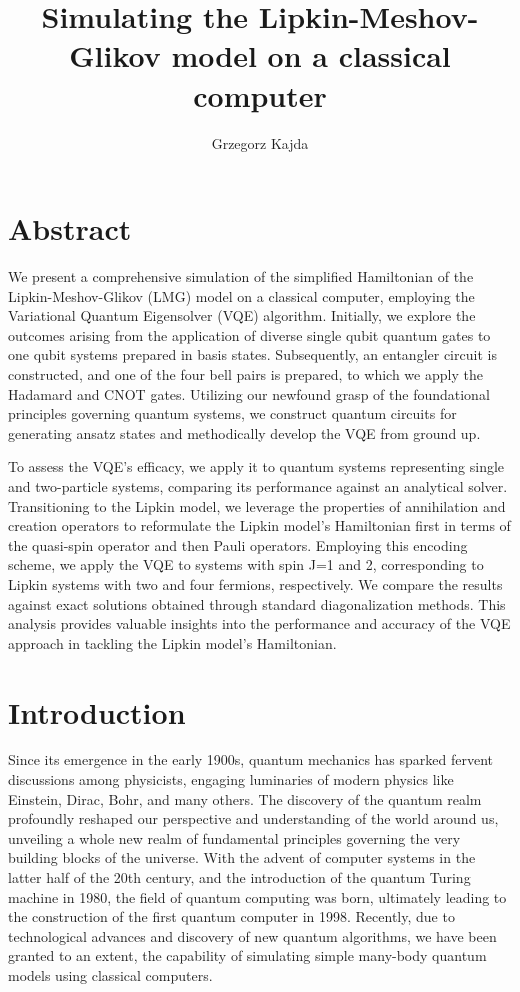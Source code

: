 \documentclass[onecolumn,10pt,cleanfoot]{asme2ej}
\author{Grzegorz Kajda
    \affiliation{
	Bachelor Student, Robotics and Intelligent Systems\\ \\[-10pt]
	Department of Informatics The faculty of Mathematics and Natural Sciences\\ \\[-10pt]
    Email: grzegork@ifi.uio.no
    }
}
\begin{document}
\title{Simulating the Lipkin-Meshov-Glikov model on a classical computer}

\maketitle

\section{Abstract}

We present a comprehensive simulation of the simplified Hamiltonian of the Lipkin-Meshov-Glikov (LMG) model on a classical computer, employing the Variational Quantum Eigensolver (VQE) algorithm. Initially, we explore the outcomes arising from the application of diverse single qubit quantum gates to one qubit systems prepared in basis states. Subsequently, an entangler circuit is constructed, and one of the four bell pairs is prepared, to which we apply the Hadamard and CNOT gates. Utilizing our newfound grasp of the foundational principles governing quantum systems, we construct quantum circuits for generating ansatz states and methodically develop the VQE from ground up.

To assess the VQE's efficacy, we apply it to quantum systems representing single and two-particle systems, comparing its performance against an analytical solver. Transitioning to the Lipkin model, we leverage the properties of annihilation and creation operators to reformulate the Lipkin model's Hamiltonian first in terms of the quasi-spin operator and then Pauli operators. Employing this encoding scheme, we apply the VQE to systems with spin J=1 and 2, corresponding to Lipkin systems with two and four fermions, respectively. We compare the results against exact solutions obtained through standard diagonalization methods. This analysis provides valuable insights into the performance and accuracy of the VQE approach in tackling the Lipkin model's Hamiltonian.
	

\section{Introduction}
Since its emergence in the early 1900s, quantum mechanics has sparked fervent discussions among physicists, engaging luminaries of modern physics like Einstein, Dirac, Bohr, and many others. The discovery of the quantum realm profoundly reshaped our perspective and understanding of the world around us, unveiling a whole new realm of fundamental principles governing the very building blocks of the universe. With the advent of computer systems in the latter half of the 20th century, and the introduction of the quantum Turing machine in 1980, the field of quantum computing was born, ultimately leading to the construction of the first quantum computer in 1998. Recently, due to technological advances and discovery of new quantum algorithms, we have been granted to an extent, the capability of simulating simple many-body quantum models using classical computers.
\end{document}
